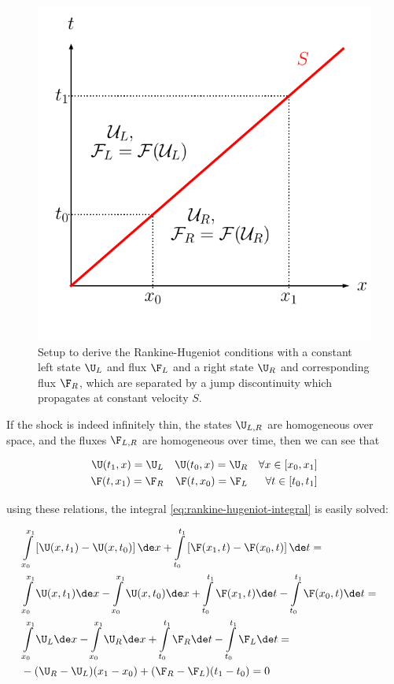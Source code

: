 \begin{figure}[H]
    \centering
    \includegraphics[width=.5\linewidth]{./figures/FV/rankine_hugeniot.pdf}%
    \caption[Setup for the Rankine-Hugeniot conditions]{
Setup to derive the Rankine-Hugeniot conditions with a constant left state $\U_L$ and flux
$\F_L$ and a right state $\U_R$ and corresponding flux $\F_R$, which are separated by a jump
discontinuity which propagates at constant velocity $S$.
}
    \label{fig:rankine-hugeniot}
\end{figure}


If the shock is indeed infinitely thin, the states $\U_{L,R}$ are homogeneous over space, and the
fluxes $\F_{L,R}$ are homogeneous over time, then we can see that

\begin{align}
    \U(t_1, x) = \U_L &&  \U(t_0, x) = \U_R && \forall x \in [x_0, x_1] \\
    \F(t, x_1) = \F_R &&  \F(t, x_0) = \F_L && \forall t \in [t_0, t_1]
\end{align}

using these relations, the integral \ref{eq:rankine-hugeniot-integral} is easily solved:

\begin{align}
    &
    \int\limits_{x_0}^{x_1} \left[ \U(x, t_1) - \U(x, t_0) \right] \de x +
    \int\limits_{t_0}^{t_1} \left[ \F(x_1, t) - \F(x_0, t) \right] \de t = &&\\
%
    &
    \int\limits_{x_0}^{x_1} \U(x, t_1) \de x -
    \int\limits_{x_0}^{x_1} \U(x, t_0) \de x +
    \int\limits_{t_0}^{t_1} \F(x_1, t) \de t -
    \int\limits_{t_0}^{t_1} \F(x_0, t) \de t = &&\\
    &
    \int\limits_{x_0}^{x_1} \U_L \de x -
    \int\limits_{x_0}^{x_1} \U_R \de x +
    \int\limits_{t_0}^{t_1} \F_R \de t -
    \int\limits_{t_0}^{t_1} \F_L \de t = &&\\
    &
    - ( \U_R - \U_L)(x_1 - x_0) + (\F_R - \F_L) (t_1 - t_0) = 0 &&
\end{align}

